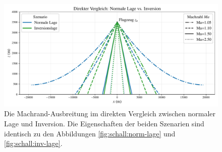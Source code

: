 \begin{figure}
    \centering
    \includegraphics[width=\textwidth]{papers/schall/figures/overlay_clean.pdf}
    \caption{Die Machrand-Ausbreitung im direkten Vergleich zwischen
    normaler Lage und Inversion. Die Eigenschaften der beiden Szenarien
    sind identisch zu den Abbildungen \ref{fig:schall:norm-lage}
    und \ref{fig:schall:inv-lage}.}
    \label{fig:schall:norm-vs-inv-lage}
\end{figure}